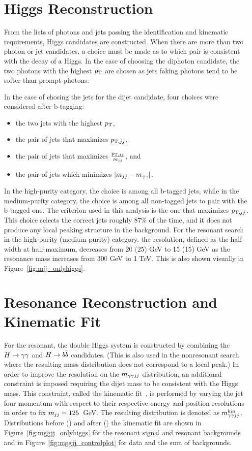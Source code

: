 \section{Higgs Reconstruction\label{sec:higgsreconstruction}}

From the lists of photons and jets passing the identification and kinematic requirements, Higgs
candidates are constructed. When there are more than two photon or jet candidates, a choice
must be made as to which pair is consistent with the decay of a Higgs. In the case
of choosing the diphoton candidate, the two photons with the highest $p_{\rm T}$ are chosen
as jets faking photons tend to be softer than prompt photons.

In the case of chosing the jets for the dijet candidate, four choices were considered after b-tagging:
\begin{itemize}
\item the two jets with the highest $p_{\rm T}$,
\item the pair of jets that maximizes $p_{{\rm T},jj}$,
\item the pair of jets that maximizes $\frac{p_{{\rm T},jj}}{m_{jj}}$, and
\item the pair of jets which minimizes $|m_{jj}-m_{\gamma\gamma}|$.
\end{itemize}
In the high-purity category, the choice is among all b-tagged jets,
while in the medium-purity category, the
choice is among all non-tagged jets to pair with the b-tagged one.
The criterion used in this analysis is the one that maximizes $p_{{\rm T},jj}$. 
This choice selects the correct jets roughly 87\% of the time, and it does not produce any local peaking
structure in the background. For the resonant search
in the high-purity (medium-purity) category, the resolution, defined as the half-width at half-maximum,
decreases from 20 (25) GeV to 15 (15) GeV as the resonance mass increases from 300 GeV to 1 TeV.
This is also shown visually in Figure~\ref{fig:mjj_onlyhiggs}.

\section{Resonance Reconstruction and Kinematic Fit\label{sec:Xreconstruction}}

For the resonant, the double Higgs system is constructed
by combining the $H\to\gamma\gamma$ and $H\to b\bar{b}$ candidates. (This is also used in the nonresonant search
where the resulting mass distribution does not correspond to a local peak.)
In order to improve the resolution on the $m_{\gamma\gamma jj}$ distribution, an additional constraint is imposed
requiring the dijet mass to be consistent with the Higgs mass. This constraint, called the
kinematic fit~\cite{Chatrchyan:2013yoa}, is performed by varying the jet four-momentum
with respect to their
respective energy and position resolutions in order to fix $m_{jj} = 125$~GeV.
The resulting distribution is denoted as $m_{\gamma\gamma jj}^{\rm kin}$. Distributions before (\Mggjj) and after (\Mggjjk)
the kinematic fit
are shown in Figure~\ref{fig:mggjj_onlyhiggs} for the resonant signal and resonant backgrounds
and in Figure~\ref{fig:mggjj_controlplot} for data and the sum of backgrounds.

